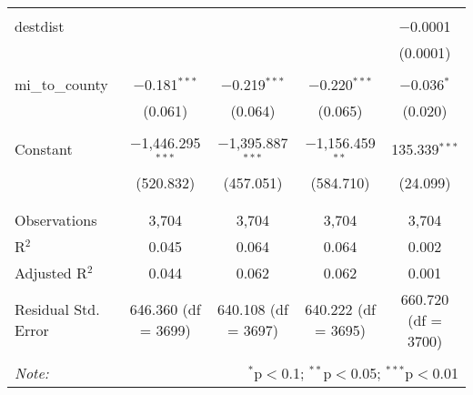 \begin{table}[!htbp]
\begin{tabular}{@{\extracolsep{5pt}}lcccc}
  & & & & \\ 
 destdist &  &  &  & $-$0.0001 \\ 
  &  &  &  & (0.0001) \\ 
  & & & & \\ 
 mi\_to\_county & $-$0.181$^{***}$ & $-$0.219$^{***}$ & $-$0.220$^{***}$ & $-$0.036$^{*}$ \\ 
  & (0.061) & (0.064) & (0.065) & (0.020) \\ 
  & & & & \\ 
 Constant & $-$1,446.295$^{***}$ & $-$1,395.887$^{***}$ & $-$1,156.459$^{**}$ & 135.339$^{***}$ \\ 
  & (520.832) & (457.051) & (584.710) & (24.099) \\ 
  & & & & \\ 
\hline \\[-1.8ex] 
Observations & 3,704 & 3,704 & 3,704 & 3,704 \\ 
R$^{2}$ & 0.045 & 0.064 & 0.064 & 0.002 \\ 
Adjusted R$^{2}$ & 0.044 & 0.062 & 0.062 & 0.001 \\ 
Residual Std. Error & 646.360 (df = 3699) & 640.108 (df = 3697) & 640.222 (df = 3695) & 660.720 (df = 3700) \\ 
\hline 
\hline \\[-1.8ex] 
\textit{Note:}  & \multicolumn{4}{r}{$^{*}$p$<$0.1; $^{**}$p$<$0.05; $^{***}$p$<$0.01} \\ 
\end{tabular} 
\end{table} 
